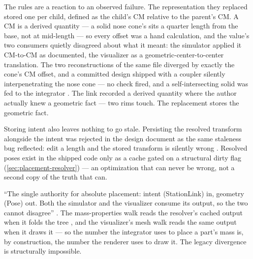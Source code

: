 The rules are a reaction to an observed failure. The representation they replaced stored
one  per child, defined as the child's CM relative to the parent's CM. A CM
is a derived quantity --- a solid nose cone's sits a quarter length from the base, not at
mid-length --- so every offset was a hand calculation, and the value's two consumers
quietly disagreed about what it meant: the simulator applied it CM-to-CM as documented,
the visualizer as a geometric-center-to-center translation. The two reconstructions of
the same file diverged by exactly the cone's CM offset, and a committed design shipped
with a coupler silently interpenetrating the nose cone --- no check fired, and a
self-intersecting solid was fed to the integrator
. The link recorded a
derived quantity where the author actually knew a geometric fact --- two rims touch. The
replacement stores the geometric fact.

Storing intent also leaves nothing to go stale. Persisting the resolved transform
alongside the intent was rejected in the design document as the same staleness bug
reflected: edit a length and the stored transform is silently wrong
. Resolved poses exist
in the shipped code only as a cache gated on a structural dirty flag
(\cref{sec:placement-resolver}) --- an optimization that can never be wrong, not a second
copy of the truth that can.

\begin{designrule}
``The single authority for absolute placement: intent (StationLink) in, geometry (Pose)
out. Both the simulator and the visualizer consume its output, so the two cannot
disagree'' . The mass-properties walk reads the
resolver's cached output when it folds the tree , and the
visualizer's mesh walk reads the same output when it draws it
 --- so the number the integrator uses to place a
part's mass is, by construction, the number the renderer uses to draw it. The legacy
divergence is structurally impossible.
\end{designrule}

